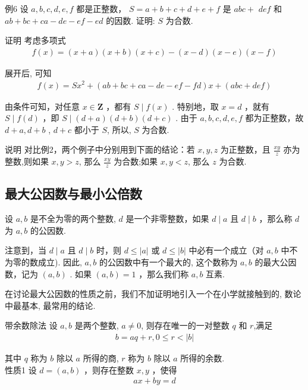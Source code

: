 例6 设 $a ,  b ,  c ,  d ,  e ,  f$ 都是正整数， $S=a+b+c+d+e+f$ 是 $a b c+$ $d e f$ 和 $a b+b c+c a-d e-e f-e d$ 的因数. 证明: $S$ 为合数. 

证明 考虑多项式\\
\begin{align*}
f(x)=(x+a)(x+b)(x+c)-(x-d)(x-e)(x-f)
\end{align*}

展开后, 可知\\
\begin{align*}
f(x)=S x^{2}+(a b+b c+c a-d e-e f-f d) x+(a b c+d e f)
\end{align*}

由条件可知，对任意 $x \in \mathbf{Z}$ ，都有 $S \mid f(x)$ . 特别地，取 $x=d$ ，就有 $S \mid f(d)$ ，即 $S \mid(d+a)(d+b)(d+c)$ . 由于 $a ,  b ,  c ,  d ,  e ,  f$ 都为正整数，故 $d+a ,  d+b$ ,  $d+c$ 都小于 $S$, 所以, $S$ 为合数. 

说明 对比例2，两个例子中分别用到下面的结论：若 $x ,  y ,  z$ 为正整数，且 $\frac{x y}{z}$ 亦为整数,则如果 $x ,  y>z$, 那么 $\frac{x y}{z}$ 为合数;如果 $x ,  y<z$, 那么 $z$ 为合数.

\subsection{最大公因数与最小公倍数}
设 $a ,  b$ 是不全为零的两个整数, $d$ 是一个非零整数，如果 $d \mid a$ 且 $d \mid b$ ，那么称 $d$ 为 $a ,  b$ 的公因数. 

注意到，当 $d \mid a$ 且 $d \mid b$ 时，则 $d \leqslant|a|$ 或 $d \leqslant|b|$ 中必有一个成立（对 $a ,  b$ 中不为零的数成立). 因此, $a ,  b$ 的公因数中有一个最大的, 这个数称为 $a ,  b$ 的最大公因数，记为 $(a, b)$ . 如果 $(a, b)=1$ ，那么我们称 $a ,  b$ 互素. 

在讨论最大公因数的性质之前，我们不加证明地引入一个在小学就接触到的, 数论中最基本, 最常用的结论. 

带余数除法 设 $a ,  b$ 是两个整数, $a \neq 0$, 则存在唯一的一对整数 $q$ 和 $r$,满足\\
\begin{align*}
b=a q+r, 0 \leqslant r<|b|
\end{align*}

其中 $q$ 称为 $b$ 除以 $a$ 所得的商, $r$ 称为 $b$ 除以 $a$ 所得的余数.\\
性质1 设 $d=(a, b)$ ，则存在整数 $x ,  y$ ，使得\\
\begin{align*}
a x+b y=d
\end{align*}

